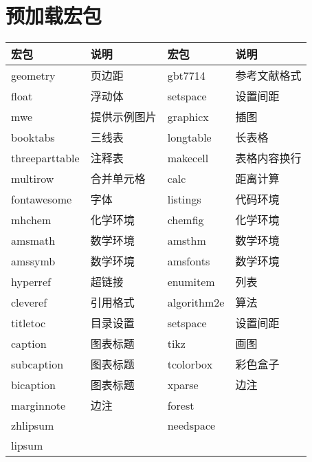 \section{预加载宏包}
\begin{table}[hp]
	\renewcommand\arraystretch{1.2}
	\centering  %
	\label{tab:1}
	\begin{tabular}{ll||ll} %
		\hline
		宏包 		&说明		    & 宏包 	   & 说明     \\
		\hline 
		geometry  &页边距	     &gbt7714	  &参考文献格式 \\
		float	  &浮动体	     &setspace	  & 设置间距  \\
		mwe 	  &提供示例图片  & graphicx  & 插图       \\
		booktabs  &三线表       & longtable &长表格      \\
		threeparttable&注释表&makecell   &表格内容换行 \\
		multirow  & 合并单元格& calc      & 距离计算   \\
		fontawesome& 字体 &listings    & 代码环境         \\
		mhchem     &化学环境     &chemfig   &化学环境     \\
		amsmath    &数学环境    &amsthm     &数学环境     \\
		amssymb    &数学环境    &amsfonts   &数学环境     \\
		hyperref   & 超链接    &enumitem    &列表         \\
		cleveref   & 引用格式   & algorithm2e & 算法\\
		titletoc   & 目录设置  &setspace     &设置间距    \\
		caption    & 图表标题  &tikz        &画图         \\
		subcaption & 图表标题  &tcolorbox   & 彩色盒子   \\
		bicaption &  图表标题   & xparse    &  边注       \\
		marginnote&  边注      &forest      &             \\
		zhlipsum    &            &needspace  &               \\
        lipsum     &    & &\\
		\hline
	\end{tabular}
\end{table}
